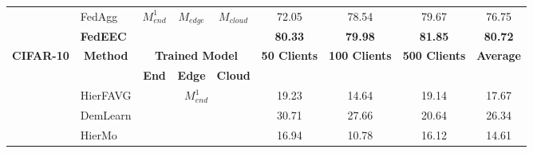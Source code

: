 \documentclass[10pt,journal]{IEEEtran}
\begin{document}
\begin{table}[]
\begin{tabular}{c|l|ccc|ccc|c}
                                   & FedAgg                                                & \multirow{2}{*}{$M_{end}^1$} & \multirow{2}{*}{$M_{edge}$} & \multirow{2}{*}{$M_{cloud}$} & 72.05                                & 78.54                                 & 79.67                                 & 76.75                             \\
                                   & \textbf{FedEEC}                                       &                        &                        &                         & \textbf{80.33}                       & \textbf{79.98}                        & \textbf{81.85}                        & \textbf{80.72}                    \\ \hline \hline
\multirow{8}{*}{\textbf{CIFAR-10}} & \multicolumn{1}{c|}{\multirow{2}{*}{\textbf{Method}}} & \multicolumn{3}{c|}{\textbf{Trained Model}}                               & \multirow{2}{*}{\textbf{50 Clients}} & \multirow{2}{*}{\textbf{100 Clients}} & \multirow{2}{*}{\textbf{500 Clients}} & \multirow{2}{*}{\textbf{Average}} \\
                                   & \multicolumn{1}{c|}{}                                 & \textbf{End}           & \textbf{Edge}          & \textbf{Cloud}          &                                      &                                       &                                       &                                   \\ \cline{2-9} 
                                   & HierFAVG                                              & \multicolumn{3}{c|}{\multirow{4}{*}{$M_{end}^1$}}                               & 19.23                                & 14.64                                 & 19.14                                 & 17.67                             \\
                                   & DemLearn                                              & \multicolumn{3}{c|}{}                                                     & 30.71                                & 27.66                                 & 20.64                                 & 26.34                             \\
                                   & HierMo                                                & \multicolumn{3}{c|}{}                                                     & 16.94                                & 10.78                                 & 16.12                                 & 14.61                             \\

\end{tabular}
\end{table}
\end{document}
